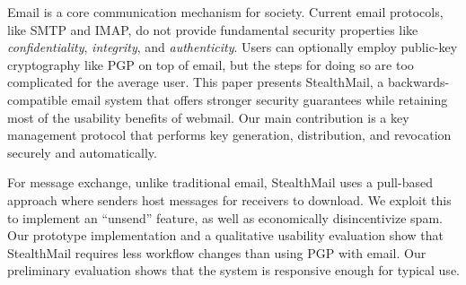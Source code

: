   Email is a core communication mechanism for society.  
Current email protocols, like SMTP and IMAP, do not provide fundamental security 
properties like \emph{confidentiality}, \emph{integrity}, and \emph{authenticity}.  Users can optionally 
employ public-key cryptography like PGP on top of email, but the steps for doing 
so are too complicated for the average user. This paper presents StealthMail, a backwards-compatible email system 
that offers stronger security guarantees while retaining most of the usability 
benefits of webmail.  Our main contribution is a key management protocol that 
performs key generation, distribution, and revocation securely and automatically. 

For message exchange, unlike traditional email, StealthMail uses a pull-based approach where senders 
host messages for receivers to download.  We exploit this to implement an ``unsend'' 
feature, as well as economically disincentivize spam. Our prototype implementation 
and a qualitative usability evaluation show that StealthMail requires less workflow changes than
using PGP with email. Our preliminary evaluation 
shows that the system is responsive enough for typical use.
